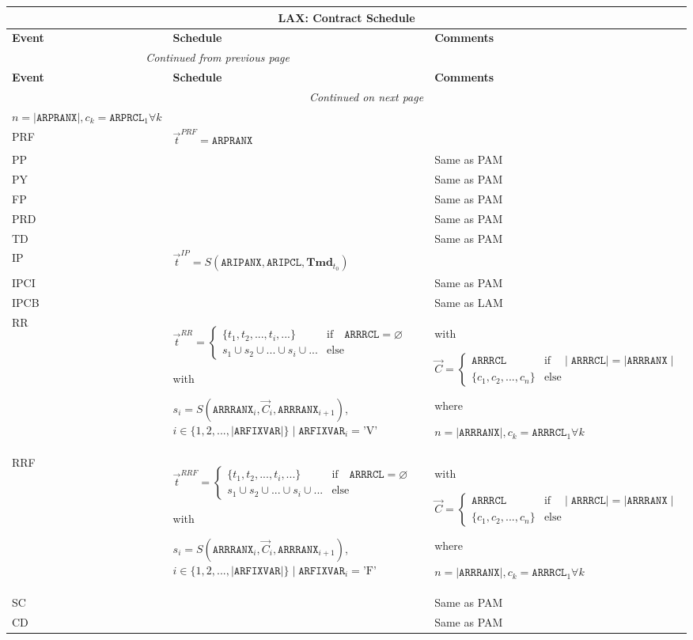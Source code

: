 \documentclass[9pt,oneside]{amsart}
\newenvironment{schedule}[1]{
	\hfill %
	\begin{longtable}{| p{0.05\textwidth} | p{0.5\textwidth} |  p{0.4\textwidth} |}
	\multicolumn{3}{c}{\textbf{#1: Contract Schedule}}\\
	\hline
	\textbf{Event} & \textbf{Schedule} & \textbf{Comments} \\
	\hline
	\endfirsthead
	\multicolumn{2}{c}{\textit{Continued from previous page}} \\
	\hline
	\textbf{Event} & \textbf{Schedule} & \textbf{Comments} \\
	\hline
	\endhead
	\hline \multicolumn{2}{r}{\textit{Continued on next page}} \\
	\endfoot
	\endlastfoot
}{%
	\hline
	\end{longtable}
}
\newcommand{\svar}[2]{\textbf{#1}_{#2}}
\newcommand{\attr}[1]{\texttt{#1}}
\newcommand{\sdl}[3]{S(#1,#2,#3)}
\newcommand{\undef}{\varnothing}
\begin{document}
\begin{schedule}{LAX}
			$n=\mid\attr{ARPRANX}\mid, c_k=\attr{ARPRCL}_1\forall k$ \\
	\hline
	PRF & $\vec{t}^{PRF} = \attr{ARPRANX}$ & \\
	\hline
	PP & & Same as PAM \\
	\hline
	PY & & Same as PAM \\
	\hline
	FP & & Same as PAM \\
	\hline
	PRD & & Same as PAM \\
	\hline
	TD & & Same as PAM \\
	\hline
	IP & $\vec{t}^{IP} = \sdl{\attr{ARIPANX}}{\attr{ARIPCL}}{\svar{Tmd}{t_0}}$ & \\
	\hline
	IPCI & & Same as PAM \\
  	\hline
	IPCB & & Same as LAM \\
	\hline
	RR & $\vec{t}^{RR} = \begin{cases} \{ t_1, t_2, ..., t_i, ... \} & \text{if}\quad \attr{ARRRCL}=\undef \\
					s_1 \cup s_2 \cup ... \cup s_i \cup ... & \text{else} \end{cases}$ \par
		with\par
		$s_i=\sdl{\attr{ARRRANX}_i}{\vec{C}_i}{\attr{ARRRANX}_{i+1}}$, $i\in\{1,2,...,\mid\attr{ARFIXVAR}\mid\} \mid \attr{ARFIXVAR}_i = \text{'V'}$
		& with\par $\vec{C} = \begin{cases} \attr{ARRRCL} & \text{if} \quad \mid\attr{ARRRCL}\mid = \mid \attr{ARRRANX}\mid \\
				   \{ c_1, c_2, ..., c_n \}  & \text{else} \end{cases}$ \par
			where\par
			$n=\mid\attr{ARRRANX}\mid, c_k=\attr{ARRRCL}_1\forall k$ \\
	\hline
	RRF & $\vec{t}^{RRF} = \begin{cases} \{ t_1, t_2, ..., t_i, ... \} & \text{if}\quad \attr{ARRRCL}=\undef \\
					s_1 \cup s_2 \cup ... \cup s_i \cup ... & \text{else} \end{cases}$ \par
		with\par
		$s_i=\sdl{\attr{ARRRANX}_i}{\vec{C}_i}{\attr{ARRRANX}_{i+1}}$, $i\in\{1,2,...,\mid\attr{ARFIXVAR}\mid\} \mid \attr{ARFIXVAR}_i = \text{'F'}$
		& with\par $\vec{C} = \begin{cases} \attr{ARRRCL} & \text{if} \quad \mid\attr{ARRRCL}\mid = \mid \attr{ARRRANX}\mid \\
				   \{ c_1, c_2, ..., c_n \}  & \text{else} \end{cases}$ \par
			where\par
			$n=\mid\attr{ARRRANX}\mid, c_k=\attr{ARRRCL}_1\forall k$ \\
	\hline
	SC & & Same as PAM \\
	\hline
	CD & & Same as PAM \\
\end{schedule}
\end{document}

